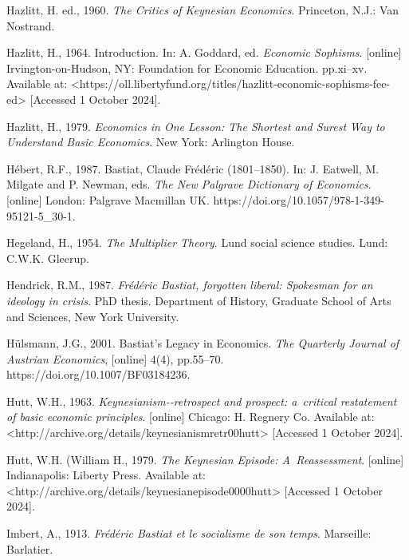 Hazlitt, H. ed., 1960. \textit{The Critics of Keynesian Economics}. Princeton, N.J.: Van Nostrand.



Hazlitt, H., 1964. Introduction. In: A. Goddard, ed. \textit{Economic Sophisms}. [online] Irvington-on-Hudson, NY: Foundation for Economic Education. pp.xi–xv. Available at: {\textless}https://oll.libertyfund.org/titles/hazlitt-economic-sophisms-fee-ed{\textgreater} [Accessed 1 October 2024].



Hazlitt, H., 1979. \textit{Economics in One Lesson: The Shortest and Surest Way to Understand Basic Economics}. New York: Arlington House.



Hébert, R.F., 1987. Bastiat, Claude Frédéric (1801–1850). In: J. Eatwell, M. Milgate and P. Newman, eds. \textit{The New Palgrave Dictionary of Economics}. [online] London: Palgrave Macmillan UK. https://doi.org/10.1057/978-1-349-95121-5\_30-1.



Hegeland, H., 1954. \textit{The Multiplier Theory}. Lund social science studies. Lund: C.W.K. Gleerup.



Hendrick, R.M., 1987. \textit{Frédéric Bastiat, forgotten liberal: Spokesman for an ideology in crisis}. PhD thesis. Department of History, Graduate School of Arts and Sciences, New York University.



Hülsmann, J.G., 2001. Bastiat's Legacy in Economics. \textit{The Quarterly Journal of Austrian Economics}, [online] 4(4), pp.55–70. https://doi.org/10.1007/BF03184236.



Hutt, W.H., 1963. \textit{Keynesianism-{}-retrospect and prospect: a~critical restatement of basic economic principles}. [online] Chicago: H. Regnery Co. Available at: {\textless}http://archive.org/details/keynesianismretr00hutt{\textgreater} [Accessed 1 October 2024].



Hutt, W.H. (William H., 1979. \textit{The Keynesian Episode: A~Reassessment}. [online] Indianapolis: Liberty Press. Available at: {\textless}http://archive.org/details/keynesianepisode0000hutt{\textgreater} [Accessed 1 October 2024].



Imbert, A., 1913. \textit{Frédéric Bastiat et le socialisme de son temps}. Marseille: Barlatier.



